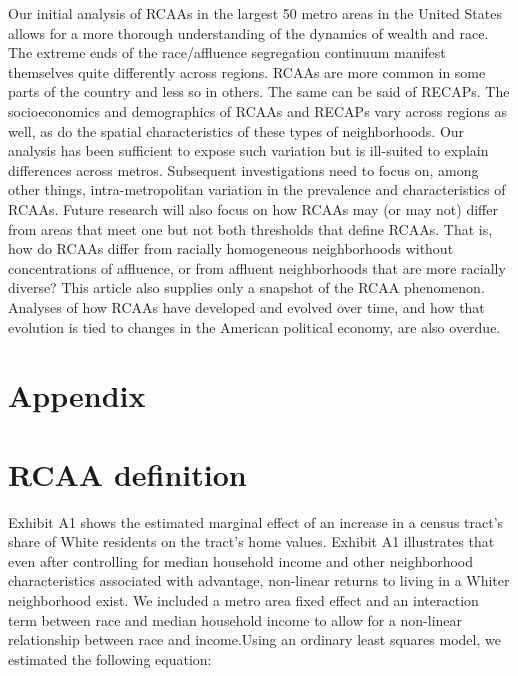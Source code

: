 \documentclass[11pt,]{article}
\begin{document}
Our initial analysis of RCAAs in the largest 50 metro areas in the
United States allows for a more thorough understanding of the dynamics
of wealth and race. The extreme ends of the race/affluence segregation
continuum manifest themselves quite differently across regions. RCAAs
are more common in some parts of the country and less so in others. The
same can be said of RECAPs. The socioeconomics and demographics of RCAAs
and RECAPs vary across regions as well, as do the spatial
characteristics of these types of neighborhoods. Our analysis has been
sufficient to expose such variation but is ill-suited to explain
differences across metros. Subsequent investigations need to focus on,
among other things, intra-metropolitan variation in the prevalence and
characteristics of RCAAs. Future research will also focus on how RCAAs
may (or may not) differ from areas that meet one but not both thresholds
that define RCAAs. That is, how do RCAAs differ from racially
homogeneous neighborhoods without concentrations of affluence, or from
affluent neighborhoods that are more racially diverse? This article also
supplies only a snapshot of the RCAA phenomenon. Analyses of how RCAAs
have developed and evolved over time, and how that evolution is tied to
changes in the American political economy, are also overdue.

\newpage

\hypertarget{refs}{}

\newpage

\clearpage
{}
\renewcommand*{\thepage}{A\arabic{page}}
\appendix

\section{Appendix}

\hypertarget{rcaa-definition}{%
\section{RCAA definition}\label{rcaa-definition}}

Exhibit A1 shows the estimated marginal effect of an increase in a
census tract's share of White residents on the tract's home values.
Exhibit A1 illustrates that even after controlling for median household
income and other neighborhood characteristics associated with advantage,
non-linear returns to living in a Whiter neighborhood exist. We included
a metro area fixed effect and an interaction term between race and
median household income to allow for a non-linear relationship between
race and income.Using an ordinary least squares model, we estimated the
following equation:
\end{document}

